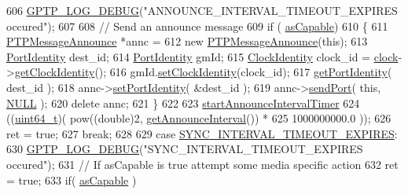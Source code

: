 \begin{DoxyCode}
606         \hyperlink{gptp__log_8hpp_ae4c6efe7c9cf6d7d3bbd28a0fd087d61}{GPTP\_LOG\_DEBUG}(\textcolor{stringliteral}{"ANNOUNCE\_INTERVAL\_TIMEOUT\_EXPIRES occured"});
607 
608         \textcolor{comment}{// Send an announce message}
609         \textcolor{keywordflow}{if} ( \hyperlink{class_common_port_a15a09cf240fb37b905e4d4e1e9f5b9a1}{asCapable})
610         \{
611             \hyperlink{class_p_t_p_message_announce}{PTPMessageAnnounce} *annc =
612                 \textcolor{keyword}{new} \hyperlink{class_p_t_p_message_announce}{PTPMessageAnnounce}(\textcolor{keyword}{this});
613             \hyperlink{class_port_identity}{PortIdentity} dest\_id;
614             \hyperlink{class_port_identity}{PortIdentity} gmId;
615             \hyperlink{class_clock_identity}{ClockIdentity} clock\_id = \hyperlink{class_common_port_aa2bc8731fa5aeb5b033feebc2b67258c}{clock}->\hyperlink{class_i_e_e_e1588_clock_a56fd598a1dfd3bfe0658272544921162}{getClockIdentity}();
616             gmId.\hyperlink{class_port_identity_abb9510d7ee3a171a6d55ab2cec30d3a6}{setClockIdentity}(clock\_id);
617             \hyperlink{class_common_port_a563117781330d95f1c6aa43837b7e4ed}{getPortIdentity}( dest\_id );
618             annc->\hyperlink{class_p_t_p_message_common_a94378ebb164e2095d3a17b393a63f2dc}{setPortIdentity}( &dest\_id );
619             annc->\hyperlink{class_p_t_p_message_announce_ab6f43fa7d50a13391867209c8a0fca16}{sendPort}( \textcolor{keyword}{this}, \hyperlink{openavb__types__base__pub_8h_a070d2ce7b6bb7e5c05602aa8c308d0c4}{NULL} );
620             \textcolor{keyword}{delete} annc;
621         \}
622 
623         \hyperlink{class_common_port_a3938df4f200087f96727e90805c543c9}{startAnnounceIntervalTimer}
624             ((\hyperlink{parse_8c_aec6fcb673ff035718c238c8c9d544c47}{uint64\_t})( pow((\textcolor{keywordtype}{double})2, \hyperlink{class_common_port_a7aa1a5fddf7129f600c97c018087b7b8}{getAnnounceInterval}()) *
625                      1000000000.0 ));
626         ret = \textcolor{keyword}{true};
627         \textcolor{keywordflow}{break};
628 
629     \textcolor{keywordflow}{case} \hyperlink{ieee1588_8hpp_a5667b805d857c6d28f83f6038a0272d3a3dba953a3ff5fdac319eca872a7fbc87}{SYNC\_INTERVAL\_TIMEOUT\_EXPIRES}:
630         \hyperlink{gptp__log_8hpp_ae4c6efe7c9cf6d7d3bbd28a0fd087d61}{GPTP\_LOG\_DEBUG}(\textcolor{stringliteral}{"SYNC\_INTERVAL\_TIMEOUT\_EXPIRES occured"});
631         \textcolor{comment}{// If asCapable is true attempt some media specific action}
632         ret = \textcolor{keyword}{true};
633         \textcolor{keywordflow}{if}( \hyperlink{class_common_port_a15a09cf240fb37b905e4d4e1e9f5b9a1}{asCapable} )

\end{DoxyCode}
